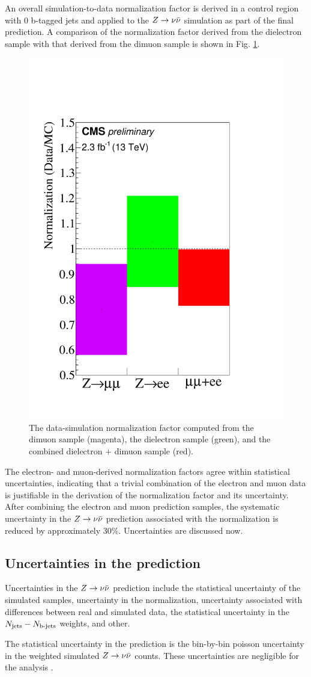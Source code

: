 An overall simulation-to-data normalization factor is derived in a control region with 0 b-tagged jets and applied to the $Z\rightarrow \nu\bar{\nu}$ simulation as part of the final prediction. A comparison of the normalization factor derived from the dielectron sample with that derived from the dimuon sample is shown in Fig. \ref{fig:ZInvNorm}.
\begin{figure}[tb!]
\centering
\includegraphics[width=0.4\linewidth]{figures/SusySearches/HadStop2015/NormFactors.pdf}
\caption{The data-simulation normalization factor computed from the dimuon sample (magenta), the dielectron sample (green), and the combined dielectron $+$ dimuon sample (red). }
\label{fig:ZInvNorm}
\end{figure}
\noindent
The electron- and muon-derived normalization factors agree within statistical uncertainties, indicating that a trivial combination of the electron and muon data is justifiable in the derivation of the normalization factor and its uncertainty. After combining the electron and muon prediction samples, the systematic uncertainty in the $Z\rightarrow \nu\bar{\nu}$ prediction associated with the normalization is reduced by approximately 30\%. Uncertainties are discussed now.

\FloatBarrier
\subsection{Uncertainties in the prediction}
Uncertainties in the $Z\rightarrow \nu\bar{\nu}$ prediction include the statistical uncertainty of the simulated samples, uncertainty in the normalization, uncertainty associated with differences between real and simulated data, the statistical uncertainty in the $N_{\rm jets}-N_{\text{b-jets}}$ weights, and other. 

The statistical uncertainty in the prediction is the bin-by-bin poisson uncertainty in the weighted simulated $Z\rightarrow \nu\bar{\nu}$ counts. These uncertainties are negligible for the analysis \cite{CMS:2016nhb}.

